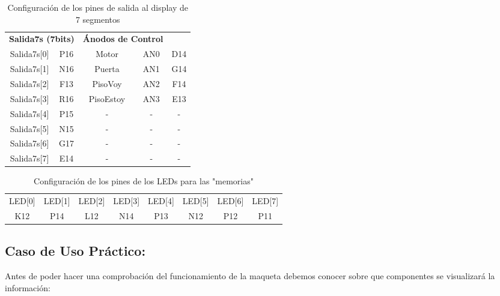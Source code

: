 	\begin{table}[H]
    \centering
		\begin{tabular}{|c|c||c|c|c|}
			\hline
			\rowcolor[rgb]{0.21,0.69,0.87}\multicolumn{5}{|c|}{  \textbf{ {Configuración Pines de los displays de 7 segmentos}}} \\
			\hline \hline
			\multicolumn{2}{|c|}{  \textbf{ { Salida7s (7bits)}}} & \multicolumn{2}{|c|}{\textbf{Ánodos de Control}} \\
			\hline
			Salida7s[0] & P16 & Motor & AN0 & D14 \\
			\hline
			Salida7s[1] & N16 & Puerta & AN1 & G14 \\
			\hline
			Salida7s[2] & F13 & PisoVoy & AN2 & F14 \\
			\hline
			Salida7s[3] & R16 & PisoEstoy & AN3 & E13 \\
			\hline
			Salida7s[4] & P15 & - & - & - \\
			\hline
			Salida7s[5] & N15 & - & - & - \\
			\hline
			Salida7s[6] & G17 & - & - & - \\
			\hline
			Salida7s[7] & E14 & - & - & - \\
			\hline
		\end{tabular}
		\caption{ Configuración de los pines de salida al display de 7 segmentos }
		\label{tab:pin7s}
	\end{table}


	\begin{table}[H]
    \centering
		\begin{tabular}{|c|c|c|c|c|c|c|c|}
			\hline
			\rowcolor[rgb]{0.21,0.69,0.87}\multicolumn{8}{|c|}{  \textbf{ {Configuración Pines de los LEDs}}} \\
			\hline \hline
			LED[0] & LED[1] & LED[2] & LED[3] & LED[4] & LED[5] & LED[6] & LED[7] \\
			\hline			
			K12 & P14 & L12 & N14 & P13 & N12 & P12 & P11 \\
			\hline
		\end{tabular}
		\caption{ Configuración de los pines de los LEDs para las "memorias" }
		\label{tab:pinLEDs}
	\end{table}
	

\subsection{Caso de Uso Práctico:}
	
	Antes de poder hacer una comprobación del funcionamiento de la maqueta debemos conocer sobre que componentes se visualizará la información:
	
